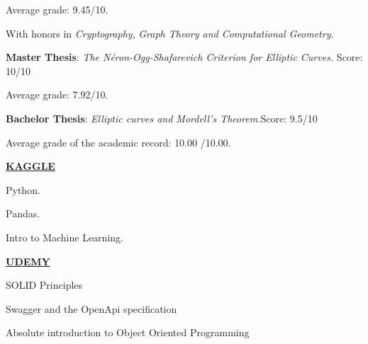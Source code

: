 \documentclass[10pt,a4paper]{altacv}
\begin{document}
Average grade: 9.45/10.

With honors in \textit{Cryptography}, \textit{Graph Theory and Computational Geometry.}

\textbf{Master Thesis}: \textit{The Néron-Ogg-Shafarevich Criterion for Elliptic Curves.}
Score: 10/10

Average grade: 7.92/10.

\textbf{Bachelor Thesis}: \textit{Elliptic curves and Mordell's Theorem.}\quad Score: 9.5/10 


Average grade of the academic record: 10.00 /10.00.


\clearpage


\begin{center}
  \underline{\textbf{KAGGLE}}
\end{center}
{\faCertificate \color{emphasis} \hspace{2mm} Python.}

{\faCertificate \color{emphasis} \hspace{2mm} Pandas.}

{\faCertificate \color{emphasis} \hspace{2mm} Intro to Machine Learning.}

\begin{center}
  \underline{\textbf{UDEMY}}
\end{center}
{\faCertificate \color{emphasis} \hspace{2mm} SOLID Principles}

{\faCertificate \color{emphasis} \hspace{2mm} Swagger and the OpenApi specification}

{\faCertificate \color{emphasis} \hspace{2mm} Absolute introduction to Object Oriented Programming}
\end{document}
